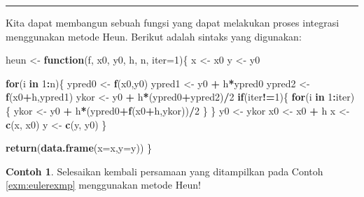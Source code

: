 \documentclass[
]{book}
\newenvironment{Shaded}{\begin{snugshade}}{\end{snugshade}}
\newcommand{\AttributeTok}[1]{\textcolor[rgb]{0.13,0.29,0.53}{#1}}
\newcommand{\ControlFlowTok}[1]{\textcolor[rgb]{0.13,0.29,0.53}{\textbf{#1}}}
\newcommand{\DecValTok}[1]{\textcolor[rgb]{0.00,0.00,0.81}{#1}}
\newcommand{\FunctionTok}[1]{\textcolor[rgb]{0.13,0.29,0.53}{\textbf{#1}}}
\newcommand{\NormalTok}[1]{#1}
\newcommand{\OtherTok}[1]{\textcolor[rgb]{0.56,0.35,0.01}{#1}}
\newcommand{\SpecialCharTok}[1]{\textcolor[rgb]{0.81,0.36,0.00}{\textbf{#1}}}
\theoremstyle{definition}
\theoremstyle{definition}
\newtheorem{example}{Contoh}[chapter]
\theoremstyle{definition}
\theoremstyle{definition}
\theoremstyle{remark}
\begin{document}
\begin{center}\rule{0.5\linewidth}{0.5pt}\end{center}

Kita dapat membangun sebuah fungsi yang dapat melakukan proses integrasi menggunakan metode Heun. Berikut adalah sintaks yang digunakan:

\begin{Shaded}
\begin{Highlighting}[]
\NormalTok{heun }\OtherTok{\textless{}{-}} \ControlFlowTok{function}\NormalTok{(f, x0, y0, h, n, }\AttributeTok{iter=}\DecValTok{1}\NormalTok{)\{}
\NormalTok{  x }\OtherTok{\textless{}{-}}\NormalTok{ x0}
\NormalTok{  y }\OtherTok{\textless{}{-}}\NormalTok{ y0}
  
  \ControlFlowTok{for}\NormalTok{(i }\ControlFlowTok{in} \DecValTok{1}\SpecialCharTok{:}\NormalTok{n)\{}
\NormalTok{    ypred0 }\OtherTok{\textless{}{-}} \FunctionTok{f}\NormalTok{(x0,y0)}
\NormalTok{    ypred1 }\OtherTok{\textless{}{-}}\NormalTok{ y0 }\SpecialCharTok{+}\NormalTok{ h}\SpecialCharTok{*}\NormalTok{ypred0}
\NormalTok{    ypred2 }\OtherTok{\textless{}{-}} \FunctionTok{f}\NormalTok{(x0}\SpecialCharTok{+}\NormalTok{h,ypred1)}
\NormalTok{    ykor }\OtherTok{\textless{}{-}}\NormalTok{ y0 }\SpecialCharTok{+}\NormalTok{ h}\SpecialCharTok{*}\NormalTok{(ypred0}\SpecialCharTok{+}\NormalTok{ypred2)}\SpecialCharTok{/}\DecValTok{2}
    \ControlFlowTok{if}\NormalTok{(iter}\SpecialCharTok{!=}\DecValTok{1}\NormalTok{)\{}
      \ControlFlowTok{for}\NormalTok{(i }\ControlFlowTok{in} \DecValTok{1}\SpecialCharTok{:}\NormalTok{iter)\{}
\NormalTok{        ykor }\OtherTok{\textless{}{-}}\NormalTok{ y0 }\SpecialCharTok{+}\NormalTok{ h}\SpecialCharTok{*}\NormalTok{(ypred0}\SpecialCharTok{+}\FunctionTok{f}\NormalTok{(x0}\SpecialCharTok{+}\NormalTok{h,ykor))}\SpecialCharTok{/}\DecValTok{2}
\NormalTok{      \}}
\NormalTok{    \}}
\NormalTok{    y0 }\OtherTok{\textless{}{-}}\NormalTok{ ykor}
\NormalTok{    x0 }\OtherTok{\textless{}{-}}\NormalTok{ x0 }\SpecialCharTok{+}\NormalTok{ h}
\NormalTok{    x }\OtherTok{\textless{}{-}} \FunctionTok{c}\NormalTok{(x, x0)}
\NormalTok{    y }\OtherTok{\textless{}{-}} \FunctionTok{c}\NormalTok{(y, y0)}
\NormalTok{  \}}
  
  \FunctionTok{return}\NormalTok{(}\FunctionTok{data.frame}\NormalTok{(}\AttributeTok{x=}\NormalTok{x,}\AttributeTok{y=}\NormalTok{y))}
\NormalTok{\}}
\end{Highlighting}
\end{Shaded}

\begin{example}
\protect\hypertarget{exm:heunexmp}{}\label{exm:heunexmp}Selesaikan kembali persamaan yang ditampilkan pada Contoh \ref{exm:eulerexmp} menggunakan metode Heun!
\end{example}
\end{document}
